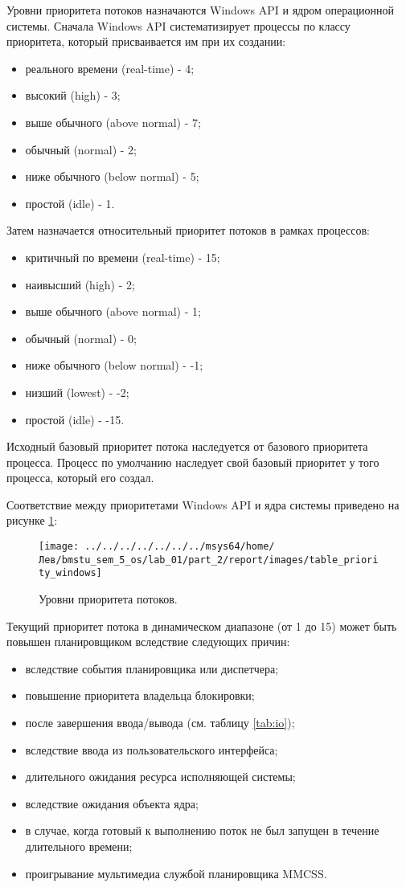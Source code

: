 Уровни приоритета потоков назначаются Windows API и ядром операционной системы. Сначала Windows API систематизирует процессы по классу приоритета, который присваивается им при их создании:
\begin{itemize}
	\item реального времени (real-time) - 4;
	\item высокий (high) - 3;
	\item выше обычного (above normal) - 7;
	\item обычный (normal) - 2; 
	\item ниже обычного (below normal) - 5;
	\item простой (idle) - 1.
\end{itemize}
 
Затем назначается относительный приоритет потоков в рамках процессов:
\begin{itemize}
	\item критичный по времени (real-time) - 15;
	\item наивысший (high) - 2;
	\item выше обычного (above normal) - 1;
	\item обычный (normal) - 0; 
	\item ниже обычного (below normal) - -1;
	\item низший (lowest) - -2;
	\item простой (idle) - -15.
\end{itemize}

Исходный базовый приоритет потока наследуется от базового приоритета процесса. Процесс по умолчанию наследует свой базовый приоритет у того процесса, который его создал. 

Соответствие между приоритетами Windows API и ядра системы приведено на рисунке \ref{png:table_priority_windows}:
\begin{figure}[H]
	\centering
	{
		\texttt{[image: ../../../../../../../msys64/home/Лев/bmstu\_sem\_5\_os/lab\_01/part\_2/report/images/table\_priority\_windows]}
		\caption{Уровни приоритета потоков.}
		\label{png:table_priority_windows}
	}
\end{figure} 

Текущий приоритет потока в динамическом диапазоне (от 1 до 15) может быть повышен планировщиком вследствие следующих причин:
\begin{itemize}
	\item вследствие события планировщика или диспетчера;
	\item повышение приоритета владельца блокировки; 
	\item после завершения ввода/вывода (см. таблицу \ref{tab:io});
	\item вследствие ввода из пользовательского интерфейса;
	\item длительного ожидания ресурса исполняющей системы;
	\item вследствие ожидания объекта ядра;
	\item в случае, когда готовый к выполнению поток не был запущен в течение длительного времени;
	\item проигрывание мультимедиа службой планировщика MMCSS.	 
\end{itemize} 

